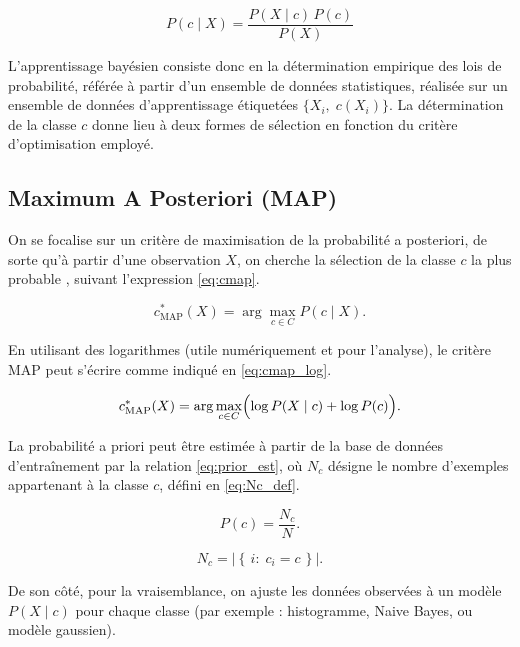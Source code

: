 \begin{equation}
\label{eq:bayes}
P(c\mid X)=\frac{P(X\mid c)\,P(c)}{P(X)}
\end{equation}


L’apprentissage bayésien consiste donc en la détermination empirique des lois de probabilité, référée à partir d’un ensemble de données statistiques, réalisée sur un ensemble de données d’apprentissage étiquetées \(\{X_i,\;c(X_i)\}\). La détermination de la classe \(c\) donne lieu à deux formes de sélection en fonction du critère d’optimisation employé.

\subsection{Maximum A Posteriori (MAP)}

On se focalise sur un critère de maximisation de la probabilité a posteriori, de sorte qu’à partir d’une observation \(X\), on cherche la sélection de la classe \(c\) la plus probable \cite{onera_ensta_estimateur_bayesien_slides}, suivant l’expression \eqref{eq:cmap}.

\begin{equation}
\label{eq:cmap}
c_{\mathrm{MAP}}^{\ast}(X)=\arg\max_{c\in C} P(c\mid X).
\end{equation}

En utilisant des logarithmes (utile numériquement et pour l’analyse), le critère MAP peut s’écrire comme indiqué en \eqref{eq:cmap_log}.

\begin{equation}
\label{eq:cmap_log}
c^{*}_{\mathrm{MAP}}(X)=\arg\max_{c\in C}\Bigl(\log P(X\mid c)+\log P(c)\Bigr).
\end{equation}

La probabilité a priori peut être estimée à partir de la base de données d’entraînement par la relation \eqref{eq:prior_est}, où \(N_c\) désigne le nombre d’exemples appartenant à la classe \(c\), défini en \eqref{eq:Nc_def}.

\begin{equation}
\label{eq:prior_est}
P(c)=\frac{N_c}{N}.
\end{equation}

\begin{equation}
\label{eq:Nc_def}
N_c=\left|\left\{\,i:\;c_i=c\,\right\}\right|.
\end{equation}

De son côté, pour la vraisemblance, on ajuste les données observées à un modèle \(P(X\mid c)\) pour chaque classe (par exemple : histogramme, Naive Bayes, ou modèle gaussien).


